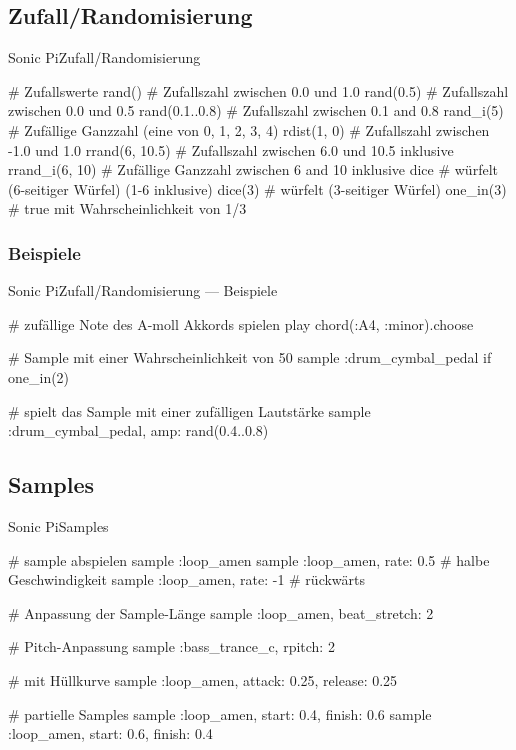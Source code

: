 \documentclass{beamer}
\begin{document}
\subsection{Zufall/Randomisierung}
\begin{frame}[fragile]{Sonic Pi}{Zufall/Randomisierung}
  \begin{rubycode}

    # Zufallswerte
    rand()          # Zufallszahl zwischen 0.0 und 1.0
    rand(0.5)       # Zufallszahl zwischen 0.0 und 0.5
    rand(0.1..0.8)  # Zufallszahl zwischen 0.1 and 0.8
    rand_i(5)       # Zufällige Ganzzahl (eine von 0, 1, 2, 3, 4)
    rdist(1, 0)     # Zufallszahl zwischen -1.0 und 1.0
    rrand(6, 10.5)  # Zufallszahl zwischen 6.0 und 10.5 inklusive
    rrand_i(6, 10)  # Zufällige Ganzzahl zwischen 6 and 10 inklusive
    dice            # würfelt (6-seitiger Würfel) (1-6 inklusive)
    dice(3)         # würfelt (3-seitiger Würfel)
    one_in(3)       # true mit Wahrscheinlichkeit von 1/3

  \end{rubycode}
\end{frame}

\subsubsection{Beispiele}
\begin{frame}[fragile]{Sonic Pi}{Zufall/Randomisierung --- Beispiele}
  \begin{rubycode}

    # zufällige Note des A-moll Akkords spielen
    play chord(:A4, :minor).choose

    # Sample mit einer Wahrscheinlichkeit von 50%
    sample :drum_cymbal_pedal if one_in(2)

    # spielt das Sample mit einer zufälligen Lautstärke
    sample :drum_cymbal_pedal, amp: rand(0.4..0.8)

  \end{rubycode}
\end{frame}

\subsection{Samples}
\begin{frame}[fragile]{Sonic Pi}{Samples}
  \begin{rubycode}
    # sample abspielen
    sample :loop_amen
    sample :loop_amen, rate: 0.5 # halbe Geschwindigkeit
    sample :loop_amen, rate: -1  # rückwärts

    # Anpassung der Sample-Länge
    sample :loop_amen, beat_stretch: 2

    # Pitch-Anpassung
    sample :bass_trance_c, rpitch: 2

    # mit Hüllkurve
    sample :loop_amen, attack: 0.25, release: 0.25

    # partielle Samples
    sample :loop_amen, start: 0.4, finish: 0.6
    sample :loop_amen, start: 0.6, finish: 0.4

  \end{rubycode}
\end{frame}
\end{document}
